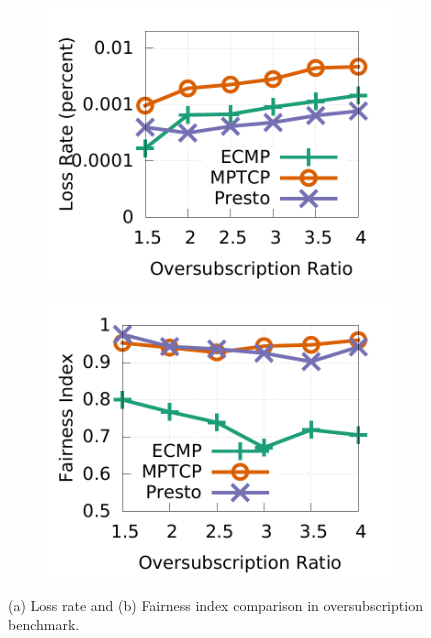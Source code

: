 \begin{figure}[t]
        \centering
	\centering
        \begin{subfigure}[b]{0.225\textwidth}
                \centering
		\includegraphics[width=\textwidth]{presto/figures/congestion_test/congestion_compare_loss.pdf}
		\caption{}
		\label{micro_congestion_test_loss}
	\end{subfigure}
	\begin{subfigure}[b]{0.225\textwidth}
		\centering
  		\includegraphics[width=\textwidth]{presto/figures/congestion_test/congestion_compare_fairness.pdf}
		\caption{}
        \label{micro_congestion_test_fairness}
	\end{subfigure}
	\caption{(a) Loss rate and (b) Fairness index comparison in oversubscription benchmark.}
\end{figure}

